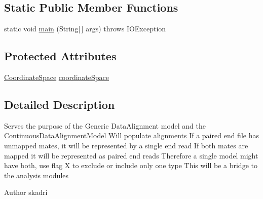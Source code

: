 \subsection*{Static Public Member Functions}
\begin{DoxyCompactItemize}
\item 
static void \hyperlink{classumms_1_1core_1_1model_1_1_j_c_s_alignment_model_ac8aef318ba79841fc69adfbe53ebeede}{main} (String\mbox{[}$\,$\mbox{]} args)  throws I\+O\+Exception
\end{DoxyCompactItemize}
\subsection*{Protected Attributes}
\begin{DoxyCompactItemize}
\item 
\hyperlink{interfaceumms_1_1core_1_1coordinatesystem_1_1_coordinate_space}{Coordinate\+Space} \hyperlink{classumms_1_1core_1_1model_1_1_j_c_s_alignment_model_aa04751a0c366de794593489168749245}{coordinate\+Space}
\end{DoxyCompactItemize}


\subsection{Detailed Description}
Serves the purpose of the Generic Data\+Alignment model and the Continuous\+Data\+Alignment\+Model Will populate alignments If a paired end file has unmapped mates, it will be represented by a single end read If both mates are mapped it will be represented as paired end reads Therefore a single model might have both, use flag X to exclude or include only one type This will be a bridge to the analysis modules \begin{DoxyAuthor}{Author}
skadri 
\end{DoxyAuthor}


